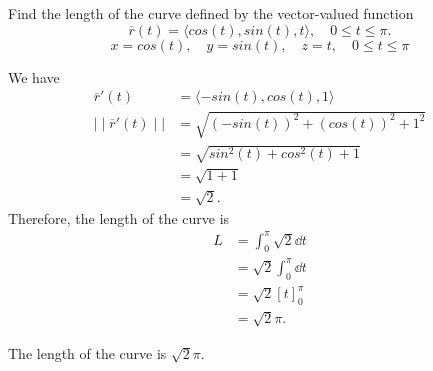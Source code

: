 \documentclass{article}
\begin{document}
\begin{examplebox}
Find the length of the curve defined by the vector-valued function
\[
    \overline{r}(t) = \langle cos(t), sin(t), t \rangle, \quad 0 \leq t \leq \pi.
\]
\[
    x = cos(t), \quad y = sin(t), \quad z = t, \quad 0 \leq t \leq \pi
\]
\begin{solutionbox}
We have
\begin{align*}
    \overline{r}'(t) &= \langle -sin(t), cos(t), 1 \rangle \\
    \mid \mid \overline{r}'(t) \mid \mid &= \sqrt{(-sin(t))^2 + (cos(t))^2 + 1^2} \\
    &= \sqrt{sin^2(t) + cos^2(t) + 1} \\
    &= \sqrt{1 + 1} \\
    &= \sqrt{2}.
\end{align*}
Therefore, the length of the curve is
\begin{align*}
    L &= \int_{0}^{\pi} \sqrt{2} \dd{t} \\
    &= \sqrt{2} \int_{0}^{\pi} \dd{t} \\
    &= \sqrt{2} \left[ t \right]_{0}^{\pi} \\
    &= \sqrt{2} \pi.
\end{align*}
\begin{answerbox}
The length of the curve is \( \sqrt{2} \pi \).
\end{answerbox}
\end{solutionbox}
\end{examplebox}
\end{document}
